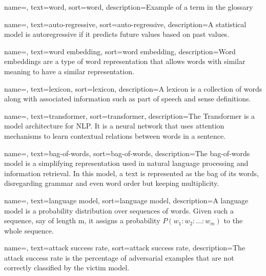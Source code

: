 {
    name=,
    text=word,
    sort=word,
    description={Example of a term in the glossary}
}

{
    name=,
    text=auto-regressive,
    sort=auto-regressive,
    description={A statistical  model is autoregressive if it predicts future values based on past values.}
}

{
    name=,
    text=word embedding,
    sort=word embedding,
    description={Word embeddings are a type of word representation that allows words with similar meaning to have a similar representation.}
}

{
    name=,
    text=lexicon,
    sort=lexicon,
    description={A lexicon is a collection of words along with associated information such as part of speech and sense definitions.}
}


{
    name=,
    text=transformer,
    sort=transformer,
    description={The Transformer is a model architecture for NLP. It is a neural network that uses attention mechanisms to learn contextual relations between words in a sentence.}
}

{
    name=,
    text=bag-of-words,
    sort=bag-of-words,
    description={The bag-of-words model is a simplifying representation used in natural language processing and information retrieval. In this model, a text is represented as the bag of its words, disregarding grammar and even word order but keeping multiplicity.}
}

{
    name=,
    text=language model,
    sort=language model,
    description={A language model is a probability distribution over sequences of words. Given such a sequence, say of length m, it assigns a probability $P(w_1:w_2:...:w_m)$ to the whole sequence.}
}

{
    name=,
    text=attack success rate,
    sort=attack success rate,
    description={The attack success rate is the percentage of adversarial examples that are not correctly classified by the victim model.}
}




